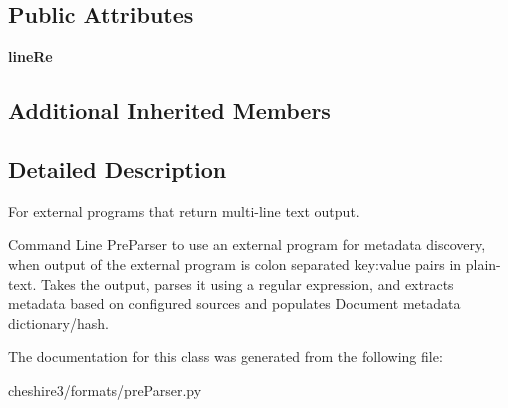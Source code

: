 \subsection*{Public Attributes}
\begin{DoxyCompactItemize}
\item 
\hypertarget{classcheshire3_1_1formats_1_1pre_parser_1_1_txt_parsing_cmd_line_metadata_discovery_pre_parser_aafefc07c22536cf620892d8c5f67c16c}{{\bfseries line\-Re}}\label{classcheshire3_1_1formats_1_1pre_parser_1_1_txt_parsing_cmd_line_metadata_discovery_pre_parser_aafefc07c22536cf620892d8c5f67c16c}

\end{DoxyCompactItemize}
\subsection*{Additional Inherited Members}


\subsection{Detailed Description}
\begin{DoxyVerb}For external programs that return multi-line text output.

Command Line PreParser to use an external program for metadata 
discovery, when output of the external program is colon separated 
key:value pairs in plain-text. Takes the output, parses it using a 
regular expression, and extracts metadata based on configured 
sources and populates Document metadata dictionary/hash.
\end{DoxyVerb}
 

The documentation for this class was generated from the following file\-:\begin{DoxyCompactItemize}
\item 
cheshire3/formats/pre\-Parser.\-py\end{DoxyCompactItemize}
